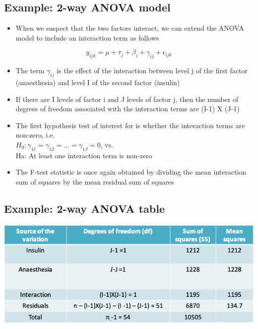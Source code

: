 \documentclass[
]{book}
\providecommand{\tightlist}{%
  \setlength{\itemsep}{0pt}\setlength{\parskip}{0pt}}
\begin{document}
\hypertarget{example-2-way-anova-model-2}{%
\subsection{Example: 2-way ANOVA model}\label{example-2-way-anova-model-2}}

\begin{itemize}
\tightlist
\item
  When we suspect that the two factors interact, we can extend the ANOVA model to include an interaction term as follows
\end{itemize}

\[y_{ijk}=\mu+\tau_j+\beta_i+\gamma_{ij}+\epsilon_{ijk}\]

\begin{itemize}
\tightlist
\item
  The term \(\gamma_{ij}\) is the effect of the interaction between level j of the first factor (anaesthesia) and level I of the second factor (insulin)
\item
  If there are I levels of factor i and J levels of factor j, then the number of degrees of freedom associated with the interaction terms are (I-1) X (J-1)
\item
  The first hypothesis test of interest for is whether the interaction terms are non-zero, i.e.\\
  \(H_0:\gamma_{11}=\gamma_{12}=...=\gamma_{1J}=0\), vs.\\
  Ha: At least one interaction term is non-zero
\item
  The F-test statistic is once again obtained by dividing the mean interaction sum of squares by the mean residual sum of squares
\end{itemize}

\hypertarget{example-2-way-anova-table}{%
\subsection{Example: 2-way ANOVA table}\label{example-2-way-anova-table}}

\includegraphics[width=1\linewidth]{./11_25}
\end{document}

